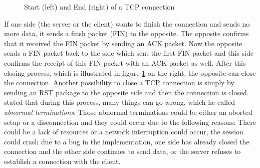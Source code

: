 \begin{figure}[ht]
\centering
{}
\hspace{1.0cm}
\caption{Start (left) and End (right) of a TCP connection}
\label{fig:tcp}
\end{figure}

If one side (the server or the client) wants to finish the connection \cite{Blog_ClosingTCPSession} and sends no more data, it sends a finsh packet (FIN) to the opposite. The opposite confirms that it received the FIN packet by sending an ACK packet. Now the opposite sends a FIN packet back to the side which sent the first FIN packet and this side confirms the receipt of this FIN packet with an ACK packet as well. After this closing process, which is illustrated in figure \ref{fig:tcp} on the right, the opposite can close the connection. Another possibility to close a TCP connection is simply by sending an RST package to the opposite side and then the connection is closed. \cite{Blog_ClosingTCPSession} stated that during this process, many things can go wrong, which he called \textit{abnormal terminations}. Those abnormal terminations could be either an aborted setup or a disconnection and they could occur due to the following reasons: There could be a lack of resources or a network interruption could occur, the session could crash due to a bug in the implementation, one side has already closed the connection and the other side continues to send data, or the server refuses to establish a connection with the client. 

